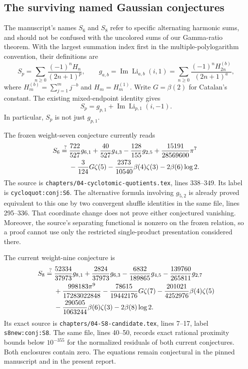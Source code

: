 \subsection{The surviving named Gaussian conjectures}
\label{sec:surviving-gaussian-conjectures}

The manuscript's names $S_6$ and $S_8$ refer to specific alternating
harmonic sums, and should not be confused with the uncolored sums of our
Gamma-ratio theorem.  With the largest summation index first in the
multiple-polylogarithm convention, their definitions are
\[
 S_p=\sum_{n\geq0}\frac{(-1)^nH_n}{(2n+1)^p},\qquad
 g_{a,b}=\operatorname{Im}\operatorname{Li}_{a,b}(i,1)
 =\sum_{n\geq0}\frac{(-1)^nH_{2n}^{(b)}}{(2n+1)^a},
\]
where $H_m^{(b)}=\sum_{j=1}^{m}j^{-b}$ and $H_m=H_m^{(1)}$.
Write $G=\beta(2)$ for Catalan's constant.  The existing mixed-endpoint
identity gives
\[
 S_p=g_{p,1}+\operatorname{Im}\operatorname{Li}_{p,1}(i,-1).
\]
In particular, $S_p$ is not just $g_{p,1}$.

The frozen weight-seven conjecture currently reads
\begin{align}
 S_6\stackrel{?}{={}}&\frac{722}{527}g_{6,1}
 +\frac{40}{527}g_{4,3}-\frac{128}{155}g_{2,5}
 +\frac{15191}{28569600}\pi^7\notag\\
 &-\frac3{124}G\zeta(5)
 -\frac{2373}{10540}\beta(4)\zeta(3)-2\beta(6)\log2.
 \label{eq:source-current-S6}
\end{align}
The source is \nolinkurl{chapters/04-cyclotomic-quotients.tex},
lines 338--349.  Its label is \texttt{cycloquot:conj:S6}.
The alternative formula involving $g_{5,2}$ is already proved equivalent
to this one by two convergent shuffle identities in the same file,
lines 295--336.  That coordinate change does not prove either conjectured
vanishing.  Moreover, the source's separating functional is nonzero on
the frozen relation, so a proof cannot use only the restricted
single-product presentation considered there.

The current weight-nine conjecture is
\begin{align}
 S_8\stackrel{?}{={}}&\frac{52334}{37973}g_{8,1}
 +\frac{2824}{37973}g_{6,3}
 -\frac{6832}{189865}g_{4,5}
 -\frac{139760}{265811}g_{2,7}\notag\\
 &+\frac{998183\pi^9}{17283022848}
 -\frac{78615}{19442176}G\zeta(7)
 -\frac{201021}{4252976}\beta(4)\zeta(5)\notag\\
 &-\frac{290505}{1063244}\beta(6)\zeta(3)-2\beta(8)\log2.
 \label{eq:source-current-S8}
\end{align}
Its exact source is \nolinkurl{chapters/04-S8-candidate.tex},
lines 7--17, label \texttt{s8new:conj:S8}.
The same file, lines 40--50, records exact rational proximity bounds
below $10^{-355}$ for the normalized residuals of both current
conjectures.  Both enclosures contain zero.  The equations remain
conjectural in the pinned manuscript and in the present report.

